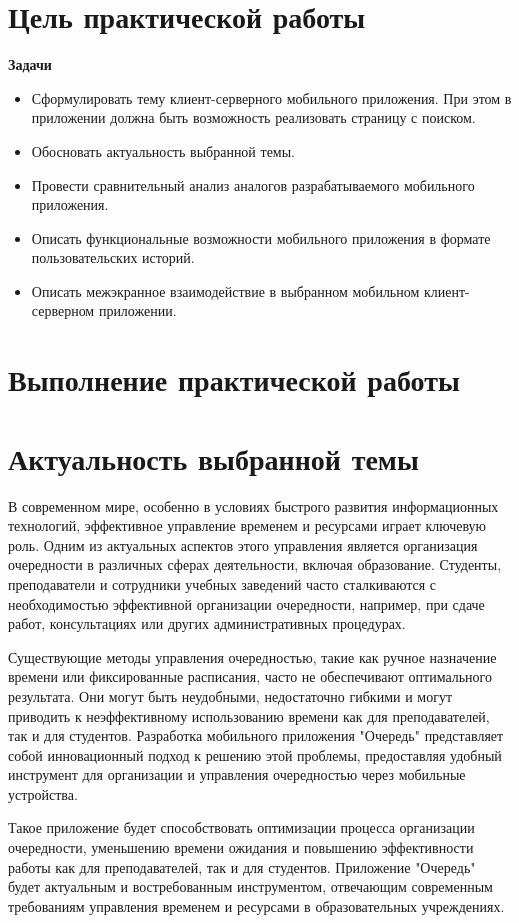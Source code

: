 \section*{\LARGE Цель практической работы}

\textbf{Задачи}
\begin{itemize}
	\item Сформулировать тему клиент-серверного мобильного приложения.
		При этом в приложении должна быть возможность реализовать
		страницу с поиском.
	\item Обосновать актуальность выбранной темы.
	\item Провести сравнительный анализ аналогов разрабатываемого
		мобильного приложения.
	\item Описать функциональные возможности мобильного приложения в
		формате пользовательских историй.
	\item Описать межэкранное взаимодействие в выбранном мобильном
		клиент-серверном приложении.
\end{itemize}

\clearpage

\section*{\LARGE Выполнение практической работы}

\section{Актуальность выбранной темы}

В современном мире, особенно в условиях быстрого развития информационных
технологий, эффективное управление временем и ресурсами играет ключевую роль.
Одним из актуальных аспектов этого управления является организация очередности
в различных сферах деятельности, включая образование.
Студенты, преподаватели и сотрудники учебных заведений часто сталкиваются
с необходимостью эффективной организации очередности, например,
при сдаче работ, консультациях или других административных процедурах.\par
Существующие методы управления очередностью,
такие как ручное назначение времени или фиксированные расписания,
часто не обеспечивают оптимального результата. Они могут быть неудобными,
недостаточно гибкими и могут приводить к неэффективному использованию времени
как для преподавателей, так и для студентов.
Разработка мобильного приложения "Очередь"
представляет собой инновационный подход к решению этой проблемы,
предоставляя удобный инструмент для организации
и управления очередностью через мобильные устройства.\par
Такое приложение будет способствовать оптимизации процесса
организации очередности, уменьшению времени ожидания
и повышению эффективности работы как для преподавателей,
так и для студентов. Приложение "Очередь" будет актуальным
и востребованным инструментом, отвечающим современным требованиям управления
временем и ресурсами в образовательных учреждениях.\par

